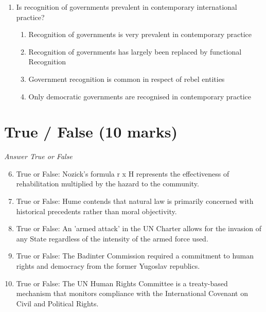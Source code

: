 \documentclass[12pt]{article}
\begin{document}
\begin{enumerate}[label=\arabic*.]
\begin{enumerate}[label=(\alph*)]
    \item Because it attempts to give effect to personal choice over individual luck.
    \item Because liberty is more important than equality.
    \item Because a market economy is just.
    \item Because the state is the best arbiter of equality between individuals.
\end{enumerate}
\item Is recognition of governments prevalent in contemporary international practice?
\begin{enumerate}[label=(\alph*)]
    \item Recognition of governments is very prevalent in contemporary practice
    \item Recognition of governments has largely been replaced by functional Recognition
    \item Government recognition is common in respect of rebel entities
    \item Only democratic governments are recognised in contemporary practice
\end{enumerate}
\end{enumerate}

\section*{True / False (10 marks)}
\textit{Answer True or False}
\begin{enumerate}[label=\arabic*.]
\setcounter{enumi}{5}
\item True or False: Nozick's formula r x H represents the effectiveness of rehabilitation multiplied by the hazard to the community.
\item True or False: Hume contends that natural law is primarily concerned with historical precedents rather than moral objectivity.
\item True or False: An 'armed attack' in the UN Charter allows for the invasion of any State regardless of the intensity of the armed force used.
\item True or False: The Badinter Commission required a commitment to human rights and democracy from the former Yugoslav republics.
\item True or False: The UN Human Rights Committee is a treaty-based mechanism that monitors compliance with the International Covenant on Civil and Political Rights.
\end{enumerate}
\end{document}
